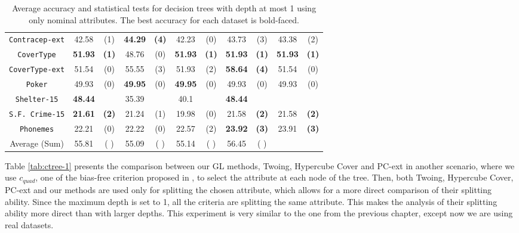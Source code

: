 \begin{table}
\begin{tabular}{c|cc|cc|cc|cc|cc}
{\tt Contracep-ext} &  42.58       & (1)          &  {\bf 44.29} & {\bf (4)}    &  42.23       & (0)              & 43.73      & (3)           & 43.38      & (2)        \\
{\tt CoverType}     &  {\bf 51.93} & {\bf (1)}    &  48.76       & (0)          & {\bf 51.93}  & {\bf (1)}        &{\bf 51.93} & {\bf (1)}     & {\bf 51.93}& {\bf (1)}  \\
{\tt CoverType-ext} &  51.54       & (0)          &  55.55       & (3)          &  51.93       & (2)              &{\bf 58.64} & {\bf (4)}     & 51.54      & (0)        \\
{\tt Poker}         &  49.93       & (0)          &  {\bf 49.95} & (0)          & {\bf 49.95}  & (0)              & 49.93      & (0)           & 49.93      & (0)        \\
{\tt Shelter-15}    &  {\bf 48.44} &              &  35.39       &              &  40.1        &                  &{\bf 48.44} &               &            &            \\
{\tt S.F. Crime-15} &  {\bf 21.61} & {\bf (2)}    &  21.24       & (1)          & 19.98        & (0)              & 21.58      & {\bf (2)}     & 21.58      & {\bf (2)}  \\
{\tt Phonemes}      &  22.21       & (0)          &  22.22       & (0)          & 22.57        & (2)              &{\bf 23.92} & {\bf (3)}     & 23.91      & {\bf (3)}  \\
\hline
Average (Sum)       &  55.81       & (  )         &  55.09       & ( )          & 55.14        & (  )             &  56.45     & (  )          &            &    
\end{tabular}
\normalsize
\caption{Average accuracy and statistical tests  for  decision trees with depth at most 1 using only nominal attributes. The best accuracy for each dataset is bold-faced.}
\label{tab:nominal-1}
\end{table}

Table \ref{tab:ctree-1} presents the 
comparison between our GL methods, Twoing, Hypercube Cover and PC-ext in another scenario,
where we use $c_{quad}$, one of the bias-free criterion proposed in \cite{Hothorn:2006:URP}, to select the attribute at each node of the tree. 
Then, both Twoing, Hypercube Cover, PC-ext and our methods are  used only for splitting the chosen attribute, which allows for a  more direct comparison of their splitting ability. Since the maximum depth is set to 1, all the criteria are splitting the same attribute. This makes the analysis of their splitting ability more direct than with larger depths. This experiment is very similar to the one from the previous chapter, except now we are using real datasets.

